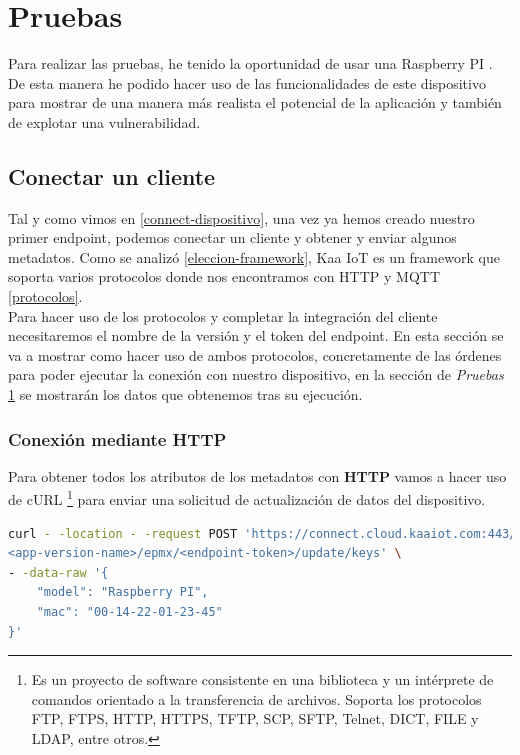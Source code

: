 \chapter{Pruebas} \label{pruebas}

Para realizar las pruebas, he tenido la oportunidad de usar una Raspberry PI \cite{raspberry-specs}. De esta manera he podido hacer uso de las funcionalidades de este dispositivo para mostrar de una manera más realista el potencial de la aplicación y también de explotar una vulnerabilidad.

\section{Conectar un cliente}

Tal y como vimos en \ref{connect-dispositivo}, una vez ya hemos creado nuestro primer endpoint, podemos conectar un cliente y obtener y enviar algunos metadatos. Como se analizó \ref{eleccion-framework}, Kaa IoT es un framework que soporta varios protocolos donde nos encontramos con HTTP y MQTT \ref{protocolos}. \\

Para hacer uso de los protocolos y completar la integración del cliente necesitaremos el nombre de la versión y el token del endpoint. En esta sección se va a mostrar como hacer uso de ambos protocolos, concretamente de las órdenes para poder ejecutar la conexión con nuestro dispositivo, en la sección de \textit{Pruebas} \ref{pruebas} se mostrarán los datos que obtenemos tras su ejecución.\\

\subsection{Conexión mediante HTTP} \label{http-connection}

Para obtener todos los atributos de los metadatos con \textbf{HTTP} vamos a hacer uso de cURL \footnote{Es un proyecto de software consistente en una biblioteca y un intérprete de comandos orientado a la transferencia de archivos. Soporta los protocolos FTP, FTPS, HTTP, HTTPS, TFTP, SCP, SFTP, Telnet, DICT, FILE y LDAP, entre otros.} para enviar una solicitud de actualización de datos del dispositivo.

\begin{lstlisting}[language=bash]
curl - -location - -request POST 'https://connect.cloud.kaaiot.com:443/kp1/
<app-version-name>/epmx/<endpoint-token>/update/keys' \
- -data-raw '{
    "model": "Raspberry PI",
    "mac": "00-14-22-01-23-45"
}'
\end{lstlisting}

